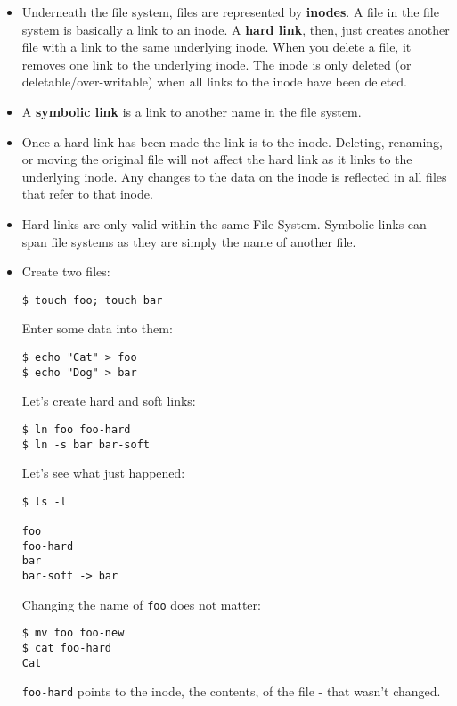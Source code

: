\documentclass[]{article}
\begin{document}
\begin{itemize}
\item
  Underneath the file system, files are represented by \textbf{inodes}.
  A file in the file system is basically a link to an inode. A
  \textbf{hard link}, then, just creates another file with a link to the
  same underlying inode. When you delete a file, it removes one link to
  the underlying inode. The inode is only deleted (or
  deletable/over-writable) when all links to the inode have been
  deleted.
\item
  A \textbf{symbolic link} is a link to another name in the file system.
\item
  Once a hard link has been made the link is to the inode. Deleting,
  renaming, or moving the original file will not affect the hard link as
  it links to the underlying inode. Any changes to the data on the inode
  is reflected in all files that refer to that inode. 
\item
  Hard links are only valid within the same File System. Symbolic links
  can span file systems as they are simply the name of another file.
\item
  Create two files:

\begin{verbatim}
$ touch foo; touch bar
\end{verbatim}

  Enter some data into them:

\begin{verbatim}
$ echo "Cat" > foo
$ echo "Dog" > bar
\end{verbatim}

  Let's create hard and soft links:

\begin{verbatim}
$ ln foo foo-hard
$ ln -s bar bar-soft
\end{verbatim}

  Let's see what just happened:

\begin{verbatim}
$ ls -l

foo
foo-hard
bar
bar-soft -> bar
\end{verbatim}

  Changing the name of \texttt{foo} does not matter:

\begin{verbatim}
$ mv foo foo-new
$ cat foo-hard
Cat
\end{verbatim}

  \texttt{foo-hard} points to the inode, the contents, of the file -
  that wasn't changed.


\end{itemize}
\end{document}
